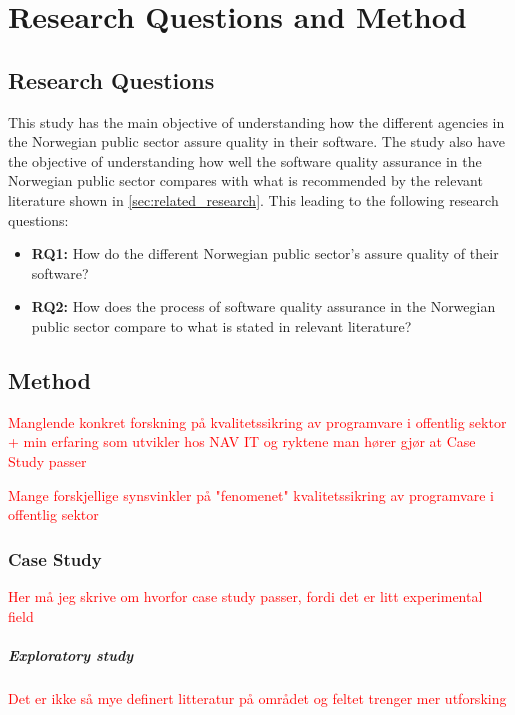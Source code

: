 \chapter{Research Questions and Method}

\section{Research Questions} 
This study has the main objective of understanding how the different agencies in the Norwegian public sector assure quality in their software. The study also have the objective of understanding how well the software quality assurance in the Norwegian public sector compares with what is recommended by the relevant literature shown in \autoref{sec:related_research}. This leading to the following research questions:

\begin{itemize}
    \item \textbf{RQ1:} How do the different Norwegian public sector's assure quality of their software?
    \item \textbf{RQ2:} How does the process of software quality assurance in the Norwegian public sector compare to what is stated in relevant literature?
\end{itemize}

\section{Method}

\textcolor{red}{Manglende konkret forskning på kvalitetssikring av programvare i offentlig sektor + min erfaring som utvikler hos NAV IT og ryktene man hører gjør at Case Study passer}

\textcolor{red}{Mange forskjellige synsvinkler på "fenomenet" kvalitetssikring av programvare i offentlig sektor}

\subsection{Case Study}

\textcolor{red}{Her må jeg skrive om hvorfor case study passer, fordi det er litt experimental field}

\paragraph{Exploratory study} \textcolor{red}{Det er ikke så mye definert litteratur på området og feltet trenger mer utforsking}

